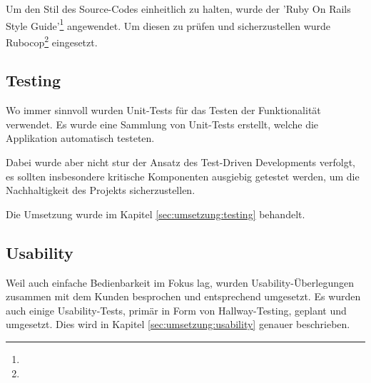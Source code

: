 Um den Stil des Source-Codes einheitlich zu halten, wurde der 'Ruby On Rails Style Guide'\footnote{} angewendet. Um diesen zu prüfen und sicherzustellen wurde Rubocop\footnote{} eingesetzt.

\subsection*{Testing}

Wo immer sinnvoll wurden Unit-Tests für das Testen der Funktionalität verwendet. Es wurde eine Sammlung von Unit-Tests erstellt, welche die Applikation automatisch testeten.

Dabei wurde aber nicht stur der Ansatz des Test-Driven Developments verfolgt, es sollten insbesondere kritische Komponenten ausgiebig getestet werden, um die Nachhaltigkeit des Projekts sicherzustellen.

Die Umsetzung wurde im Kapitel \ref{sec:umsetzung:testing} behandelt.

\subsection*{Usability}

Weil auch einfache Bedienbarkeit im Fokus lag, wurden Usability-Überlegungen zusammen mit dem Kunden besprochen und entsprechend umgesetzt. Es wurden auch einige Usability-Tests, primär in Form von Hallway-Testing, geplant und umgesetzt. Dies wird in Kapitel \ref{sec:umsetzung:usability} genauer beschrieben.